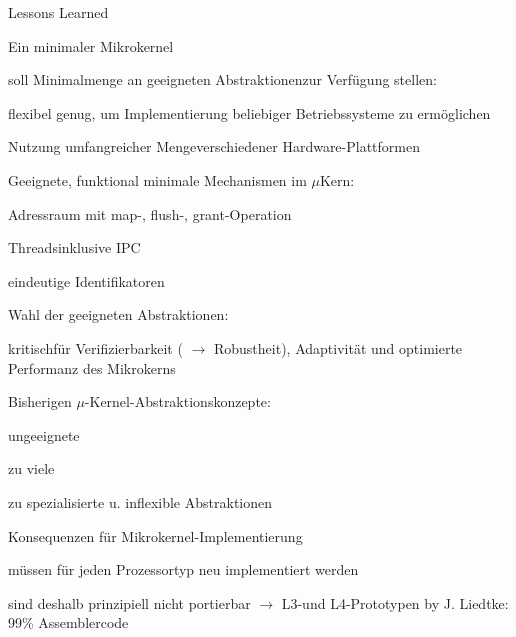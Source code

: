 \documentclass[a4paper]{article}
\begin{document}
\begin{multicols}{3}
    Lessons Learned

    \begin{enumerate*}
        \item
        Ein minimaler Mikrokernel
        \begin{itemize*}
            \item soll Minimalmenge an geeigneten Abstraktionenzur Verfügung stellen:
            \item flexibel genug, um Implementierung beliebiger Betriebssysteme zu ermöglichen
            \item Nutzung umfangreicher Mengeverschiedener Hardware-Plattformen
        \end{itemize*}
        \item
        Geeignete, funktional minimale Mechanismen im $\mu$Kern:
        \begin{itemize*}
            \item Adressraum mit map-, flush-, grant-Operation
            \item Threadsinklusive IPC
            \item eindeutige Identifikatoren
        \end{itemize*}
        \item
        Wahl der geeigneten Abstraktionen:
        \begin{itemize*}
            \item kritischfür Verifizierbarkeit ( $\rightarrow$  Robustheit), Adaptivität und optimierte Performanz des Mikrokerns
        \end{itemize*}
        \item
        Bisherigen $\mu$-Kernel-Abstraktionskonzepte:
        \begin{enumerate*}
            \def\labelenumii{\arabic{enumii}.}
            \item ungeeignete
            \item zu viele
            \item zu spezialisierte u. inflexible Abstraktionen
        \end{enumerate*}
        \item
        Konsequenzen für Mikrokernel-Implementierung
        \begin{itemize*}
            \item müssen für jeden Prozessortyp neu implementiert werden
            \item sind deshalb prinzipiell nicht portierbar $\rightarrow$  L3-und L4-Prototypen by J. Liedtke: 99\% Assemblercode

\end{itemize*}
\end{enumerate*}
\end{multicols}
\end{document}

